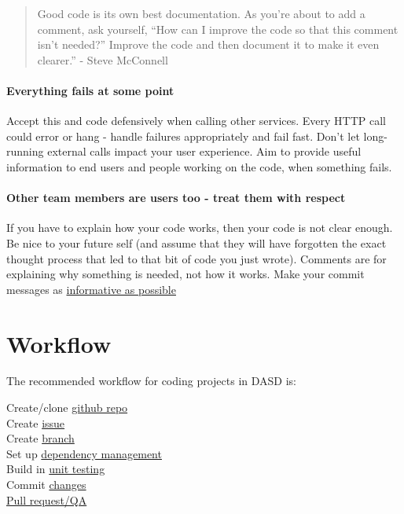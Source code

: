 \documentclass[]{book}
\begin{document}
\begin{quote}
Good code is its own best documentation. As you're about to add a comment, ask yourself, ``How can I improve the code so that this comment isn't needed?'' Improve the code and then document it to make it even clearer.'' - Steve McConnell
\end{quote}

\hypertarget{errors}{%
\subsubsection{Everything fails at some point}\label{errors}}

Accept this and code defensively when calling other services.
Every HTTP call could error or hang - handle failures appropriately and fail fast. Don't let long-running external calls impact your user experience.
Aim to provide useful information to end users and people working on the code, when something fails.

\hypertarget{users}{%
\subsubsection{Other team members are users too - treat them with respect}\label{users}}

If you have to explain how your code works, then your code is not clear enough.
Be nice to your future self (and assume that they will have forgotten the exact thought process that led to that bit of code you just wrote).
Comments are for explaining why something is needed, not how it works.
Make your commit messages as \href{https://robots.thoughtbot.com/5-useful-tips-for-a-better-commit-message}{informative as possible}

\hypertarget{wf}{%
\chapter{Workflow}\label{wf}}

The recommended workflow for coding projects in DASD is:

Create/clone \protect\hyperlink{versioncontrol}{github repo}\\
Create \protect\hyperlink{versioncontrol}{issue}\\
Create \protect\hyperlink{versioncontrol}{branch}\\
Set up \protect\hyperlink{projdep}{dependency management}\\
Build in \protect\hyperlink{unittest}{unit testing}\\
Commit \protect\hyperlink{versioncontrol}{changes}\\
\protect\hyperlink{review}{Pull request/QA}
\end{document}
